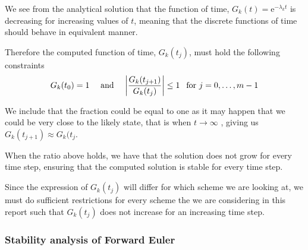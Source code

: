 \documentclass[12pt,english,a4paper]{article}
\renewcommand{\exp}[1]{\mathrm{e}^{#1}}
\begin{document}
We see from the analytical solution that the function of time, \(G_k(t) = \exp{-\lambda_k t}\) is decreasing for increasing values of \(t\), meaning that the discrete functions of time should behave in equivalent manner. 

Therefore the computed function of time, \(G_k(t_j)\), must hold the following constraints
\[
G_k(t_{0}) = 1 \quad \text{ and }\quad \abs{\frac{G_k(t_{j+1}) } {G_k(t_j) } }\leq 1 \:\:\text{ for } j = 0, \dots,m-1 
\]

We include that the fraction could be equal to one as it may happen that we could be very close to the likely state, that is when \(t \to \infty \)  , giving us \( G_k(t_{j+1}) \approx G_k(t_{j} \). 

When the ratio above holds, we have that the solution does not grow for every time step, ensuring that the computed solution is stable for every time step. 

Since the expression of \(G_k(t_{j})\) will differ for which scheme we are looking at, we must do sufficient restrictions for every scheme the we are considering in this report such that \(G_k(t_{j})\) does not increase for an increasing time step. 
\subsubsection{Stability analysis of Forward Euler}
\end{document}
